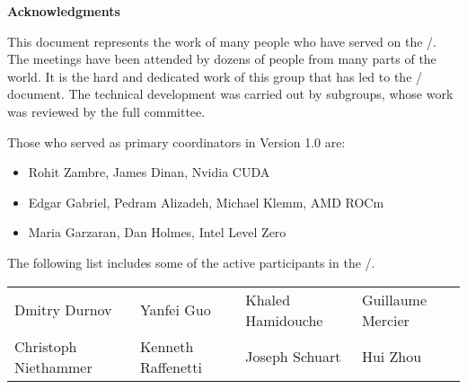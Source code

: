 {\Huge\noindent\textbf{Acknowledgments}}%
{}

\vspace{0.5in}



This document represents the work of many people who have served on
the \MPIHACC/.  The meetings have been attended by dozens of people
from many parts of the world. It is the hard and dedicated work of
this group that has led to the \MEMALLOCDOC/ document. The technical
development was carried out by subgroups, whose work was reviewed by
the full committee.

Those who served as primary coordinators in Version 1.0 are:

\begin{itemize}
\item Rohit Zambre, James Dinan, Nvidia CUDA
\item Edgar Gabriel, Pedram Alizadeh, Michael Klemm, AMD ROCm
\item Maria Garzaran, Dan Holmes, Intel Level Zero
\end{itemize}

The following list includes some of the active participants in
the \MPIHACC/.

\begin{center}
\begin{tabular}{llll}
Dmitry Durnov &
Yanfei Guo &
Khaled Hamidouche &
Guillaume Mercier\\
Christoph Niethammer &
Kenneth Raffenetti &
Joseph Schuart	&
Hui Zhou
\end{tabular}
\end{center}


